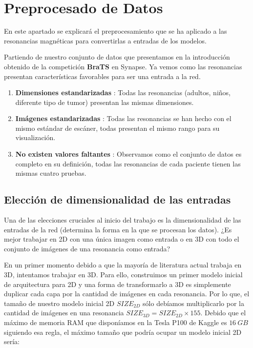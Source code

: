 \section{Preprocesado de Datos}

En este apartado se explicará el preprocesamiento que se ha aplicado a las resonancias magnéticas para convertirlas a entradas de los modelos. 

Partiendo de nuestro conjunto de datos que presentamos en la introducción obtenido de la competición \textbf{BraTS} en Synapse. Ya vemos como las resonancias presentan características favorables para ser una entrada a la red.

\begin{enumerate}
	\item \textbf{Dimensiones estandarizadas} : Todas las resonancias (adultos, niños, diferente tipo de tumor) presentan las mismas dimensiones.
	\item \textbf{Imágenes estandarizadas} : Todas las resonancias se han hecho con el mismo estándar de escáner, todas presentan el mismo rango para su visualización. 
	\item \textbf{No existen valores faltantes} : Observamos como el conjunto de datos es completo en su definición, todas las resonancias de cada paciente tienen las mismas cuatro pruebas.
\end{enumerate}

\subsection{Elección de dimensionalidad de las entradas}

Una de las elecciones cruciales al inicio del trabajo es la dimensionalidad de las entradas de la red (determina la forma en la que se procesan los datos). ¿Es mejor trabajar en 2D con una única imagen como entrada o en 3D con todo el conjunto de imágenes de una resonancia como entrada?

En un primer momento debido a que la mayoría de literatura actual trabaja en 3D, intentamos trabajar en 3D. Para ello, construimos un primer modelo inicial de arquitectura para 2D y  una forma de transformarlo a 3D es simplemente duplicar cada capa por la cantidad de imágenes en cada resonancia. Por lo que, el tamaño de nuestro modelo inicial 2D $SIZE_{2D}$ sólo debíamos multiplicarlo por la cantidad de imágenes en una resonancia $SIZE_{3D} = SIZE_{2D} \times 155 $. Debido que el máximo de memoria RAM que disponíamos en la Tesla P100 de Kaggle es $16\ GB$ siguiendo esa regla, el máximo tamaño que podría ocupar un modelo inicial 2D sería: 

